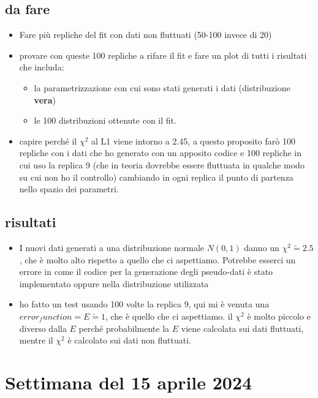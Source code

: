 \documentclass{article}
\begin{document}
    \subsection{da fare}
    \begin{itemize}
        \item Fare più repliche del fit con dati non fluttuati (50-100 invece di 20)
        \item provare con queste 100 repliche a rifare il fit e fare un plot di tutti i risultati che includa:
        \begin{itemize}
            \item la parametrizzazione con cui sono stati generati i dati (distribuzione \textbf{vera})
            \item le 100 distribuzioni ottenute con il fit.
        \end{itemize}
        \item capire perché il $\chi^2$ al L1 viene intorno a 2.45, a questo proposito farò 100 repliche con i dati che ho generato con un apposito codice e 100 repliche in cui uso la replica 9 (che in teoria dovrebbe essere fluttuata in qualche modo su cui non ho il controllo) cambiando in ogni replica il punto di partenza nello spazio dei parametri.
    \end{itemize}

    \subsection{risultati}
    \begin{itemize}
        \item I nuovi dati generati a una distribuzione normale $N(0,1)$ danno un $\chi^2 \tilde= 2.5 $, che è molto alto rispetto a quello che ci aspettiamo. Potrebbe esserci un errore in come il codice per la generazione degli pseudo-dati è stato implementato oppure nella distribuzione utilizzata
        \item ho fatto un test usando 100 volte la replica 9, qui mi è venuta una $error_function = E \tilde= 1$, che è quello che ci aspettiamo. il $\chi^2$ è molto piccolo e diverso dalla $E$ perché probabilmente la $E$ viene calcolata sui dati fluttuati, mentre il $\chi^2$ è calcolato sui dati non fluttuati.
        
    \end{itemize}
\section{Settimana del 15 aprile 2024}
\end{document}
